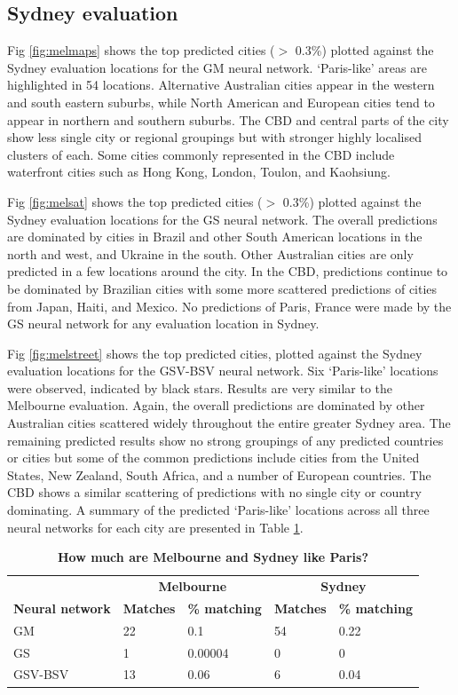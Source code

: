 \documentclass[10pt,letterpaper]{article}
\begin{document}
\subsection*{Sydney evaluation} 

Fig \ref{fig:melmaps} shows the top predicted cities ($>$ 0.3\%) plotted against the Sydney evaluation locations for the GM neural network. `Paris-like' areas are highlighted in 54 locations.  Alternative Australian cities appear in the western and south eastern suburbs, while North American and European cities tend to appear in northern and southern suburbs. The CBD and central parts of the city show less single city or regional groupings but with stronger highly localised clusters of each. Some cities commonly represented in the CBD include waterfront cities such as Hong Kong, London, Toulon, and Kaohsiung. 

Fig \ref{fig:melsat} shows the top predicted cities ($>$ 0.3\%) plotted against the Sydney evaluation locations for the GS neural network. The overall predictions are dominated by cities in Brazil and other South American locations in the north and west, and Ukraine in the south. Other Australian cities are only predicted in a few locations around the city. In the CBD, predictions continue to be dominated by Brazilian cities with some more scattered predictions of cities from Japan, Haiti, and Mexico. No predictions of Paris, France were made by the GS neural network for any evaluation location in Sydney.

Fig \ref{fig:melstreet} shows the top predicted cities, plotted against the Sydney evaluation locations for the GSV-BSV neural network. Six `Paris-like' locations were observed, indicated by black stars. Results are very similar to the Melbourne evaluation. Again, the overall predictions are dominated by other Australian cities scattered widely throughout the entire greater Sydney area. The remaining predicted results show no strong groupings of any predicted countries or cities but some of the common predictions include cities from the United States, New Zealand, South Africa, and a number of European countries. The CBD shows a similar scattering of predictions with no single city or country dominating. A summary of the predicted `Paris-like' locations across all three neural networks for each city are presented in Table \ref{tab:melbournesydneyparis}.


\begin{table}[!htbp]
\caption{\bf How much are Melbourne and Sydney like Paris? \label{tab:melbournesydneyparis}}     
\begin{tabular}{ l  l l l  l}
 \hline    &  \multicolumn{2}{c}{\textbf{Melbourne}} & \multicolumn{2}{c}{\textbf{Sydney}}  \\  
\textbf{Neural network} & \textbf{Matches} & \textbf{\% matching}  & \textbf{Matches} & \textbf{\% matching}\\ \hline
GM & 22 & 0.1 & 54 & 0.22 \\ 
GS & 1 & 0.00004 & 0 & 0 \\ 
GSV-BSV & 13 & 0.06 & 6 & 0.04 \\ \hline
\end{tabular}
\end{table}
\end{document}
